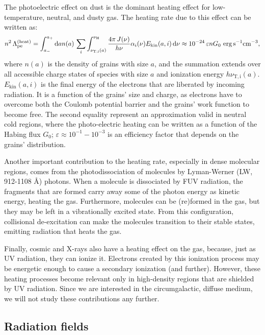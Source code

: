 The photoelectric effect on dust is the dominant heating effect for low-temperature, neutral, and dusty gas. The heating rate due to this effect can be written as:
\begin{align}
    n^2 \,\Lambda_\mathrm{pe}^\mathrm{(heat)} = \int_{a_-}^{a_+} \mathrm{d} a n(a)\,\sum_i \int_{\nu_\mathrm{T,i}(a)}^{\nu_\mathrm{H}} \frac{4\pi\,J(\nu)}{h\nu} \alpha_i(\nu)E_\mathrm{kin}(a,i)\,\mathrm{d} \nu \approx 10^{-24}\,\varepsilon n G_0\,\,\mathrm{erg}\,\mathrm{s}^{-1}\mathrm{cm}^{-3},
\end{align}
where $n(a)$ is the density of grains with size $a$, and the summation extends over all accessible charge states of species with size $a$ and ionization energy $h\nu_\mathrm{T,i}(a)$. $E_\mathrm{kin}(a,i)$ is the final energy of the electrons that are liberated by incoming radiation. It is a function of the grains' size and charge, as electrons have to overcome both the Coulomb potential barrier and the grains' work function to become free. The second equality represent an approximation valid in neutral cold regions, where the photo-electric heating can be written as a function of the Habing flux $G_0$; $\varepsilon \approx 10^{-1}-10^{-3}$ is an efficiency factor that depends on the grains' distribution.

Another important contribution to the heating rate, especially in dense molecular regions, comes from the photodissociation of \HH molecules by Lyman-Werner (LW, 912-1108 \AA) photons. When a molecule is dissociated by FUV radiation, the fragments that are formed carry away some of the photon energy as kinetic energy, heating the gas. Furthermore, molecules can be (re)formed in the gas, but they may be left in a vibrationally excited state. From this configuration, collisional de-excitation can make the molecules transition to their stable states, emitting radiation that heats the gas.

Finally, cosmic and X-rays also have a heating effect on the gas, because, just as UV radiation, they can ionize it. Electrons created by this ionization process may be energetic enough to cause a secondary ionization (and further). However, these heating processes become relevant only in high-density regions that are shielded by UV radiation. Since we are interested in the circumgalactic, diffuse medium, we will not study these contributions any further.

\subsection{Radiation fields} \label{sec:radiation_fields}


